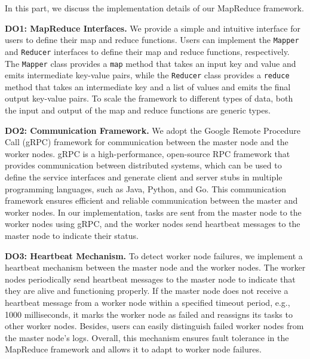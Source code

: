 In this part, we discuss the implementation details of our MapReduce framework. 

\textbf{DO1: MapReduce Interfaces.} We provide a simple and intuitive interface for users to define their map and reduce functions. Users can implement the \texttt{Mapper} and \texttt{Reducer} interfaces to define their map and reduce functions, respectively. The \texttt{Mapper} class provides a \texttt{map} method that takes an input key and value and emits intermediate key-value pairs, while the \texttt{Reducer} class provides a \texttt{reduce} method that takes an intermediate key and a list of values and emits the final output key-value pairs. To scale the framework to different types of data, both the input and output of the map and reduce functions are generic types.

\textbf{DO2: Communication Framework.} We adopt the Google Remote Procedure Call (gRPC) framework for communication between the master node and the worker nodes. gRPC is a high-performance, open-source RPC framework that provides communication between distributed systems, which can be used to define the service interfaces and generate client and server stubs in multiple programming languages, such as Java, Python, and Go. This communication framework ensures efficient and reliable communication between the master and worker nodes. In our implementation, tasks are sent from the master node to the worker nodes using gRPC, and the worker nodes send heartbeat messages to the master node to indicate their status. 

\textbf{DO3: Heartbeat Mechanism.} To detect worker node failures, we implement a heartbeat mechanism between the master node and the worker nodes. The worker nodes periodically send heartbeat messages to the master node to indicate that they are alive and functioning properly. If the master node does not receive a heartbeat message from a worker node within a specified timeout period, e.g., 1000 milliseconds, it marks the worker node as failed and reassigns its tasks to other worker nodes. Besides, users can easily distinguish failed worker nodes from the master node's logs. Overall, this mechanism ensures fault tolerance in the MapReduce framework and allows it to adapt to worker node failures.


